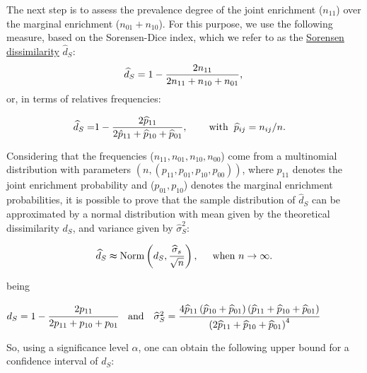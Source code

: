 The next step is to assess the prevalence degree of the joint enrichment (\(n_{11}\)) over the marginal enrichment (\(n_{01} + n_{10}\)). For this purpose, we use the following measure, based on the Sorensen-Dice index, which we refer to as the \hyperref[fig:cycle]{Sorensen dissimilarity} \(\widehat{d}_S\):
\begin{equation*}
\widehat{d}_S = 1 - \dfrac{2n_{11}}{2n_{11} + n_{10} + n_{01}}, \\
\end{equation*}
or, in terms of relatives frequencies:

\begin{equation*}
\begin{aligned}
\widehat{d}_S = & 1 - \dfrac{2\widehat{p}_{11}}{2\hat{p}_{11} + \widehat{p}_{10} + \widehat{p}_{01}}, \hspace{0.75cm}  \text{with} \hspace{0.2cm} \widehat{p}_{ij} = n_{ij} / n.
\end{aligned}
\end{equation*}

Considering that the frequencies (\(n_{11}, n_{01}, n_{10}, n_{00}\)) come from a multinomial distribution with parameters \((n, (p_{11}, p_{01}, p_{10}, p_{00}))\), where \(p_{11}\) denotes the joint enrichment probability and (\(p_{01}, p_{10}\)) denotes the marginal enrichment probabilities, it is possible to prove that the sample distribution of \(\widehat{d}_S\) can be approximated by a normal distribution with mean given by the theoretical dissimilarity \(d_S\), and variance given by \(\widehat \sigma _S^2\):

\begin{equation*}
\begin{aligned}
\widehat{d}_S \thickapprox \text{Norm} \left(d_S, \frac{\widehat{\sigma}_s}{\sqrt{n}}\right), 
\hspace{0.5cm} \text{when }  n \to \infty.
\end{aligned}
\end{equation*}

being

\(d_S = 1 - \cfrac{2p_{11}}{2p_{11} + p_{10} + p_{01}} \quad \text{and} \quad \widehat{\sigma}_S^2 = \cfrac{4\widehat{p}_{11}\left(\widehat{p}_{10} + \widehat{p}_{01}\right)\left(\widehat{p}_{11} + \widehat{p}_{10} + \widehat{p}_{01}\right)}{\left(2\widehat{p}_{11} + \widehat{p}_{10} + \widehat{p}_{01}\right)^4}\)

So, using a significance level \(\alpha\), one can obtain the following upper bound for a confidence interval of \(d_S\):

